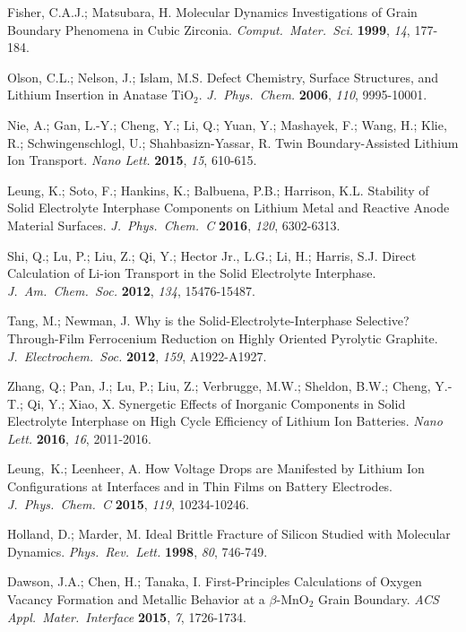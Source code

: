 \documentclass[prb,preprint,amsmath,amssymb]{revtex4}
\begin{document}
\begin{references}
Fisher, C.A.J.; Matsubara, H.  Molecular Dynamics Investigations of
Grain Boundary Phenomena in Cubic Zirconia.  {\it Comput.~Mater.~Sci.}
{\bf 1999}, {\it 14}, 177-184.

Olson, C.L.; Nelson, J.; Islam, M.S.  
Defect Chemistry, Surface Structures, and Lithium Insertion in Anatase TiO$_2$.
{\it J.~Phys.~Chem.} {\bf 2006}, {\it 110}, 9995-10001.

Nie, A.; Gan, L.-Y.; Cheng, Y.; Li, Q.; Yuan, Y.; Mashayek, F.; 
Wang, H.; Klie, R.; Schwingenschlogl, U.; Shahbasizn-Yassar, R.
Twin Boundary-Assisted Lithium Ion Transport.  {\it Nano Lett.}
{\bf 2015}, {\it 15}, 610-615.

Leung, K.; Soto, F.; Hankins, K.; Balbuena, P.B.; Harrison, K.L.
Stability of Solid Electrolyte Interphase Components on Lithium
Metal and Reactive Anode Material Surfaces.
{\it J.~Phys.~Chem.~C} {\bf 2016}, {\it 120}, 6302-6313.

Shi, Q.; Lu, P.; Liu, Z.; Qi, Y.; Hector Jr., L.G.; Li, H.; Harris, S.J.
Direct Calculation of Li-ion Transport in the Solid Electrolyte Interphase.
{\it J.~Am.~Chem.~Soc.} {\bf 2012}, {\it 134}, 15476-15487.

Tang, M.; Newman, J. 
Why is the Solid-Electrolyte-Interphase Selective?  Through-Film
Ferrocenium Reduction on Highly Oriented Pyrolytic Graphite.
{\it J.~Electrochem.~Soc.} {\bf 2012}, {\it 159}, A1922-A1927.

Zhang, Q.; Pan, J.; Lu, P.; Liu, Z.; Verbrugge, M.W.; Sheldon, B.W.;
Cheng, Y.-T.; Qi, Y.; Xiao, X.
Synergetic Effects of Inorganic Components in Solid Electrolyte Interphase
on High Cycle Efficiency of Lithium Ion Batteries.
{\it Nano Lett.} {\bf 2016}, {\it 16}, 2011-2016.

Leung,~K.; Leenheer, A.
How Voltage Drops are Manifested by Lithium Ion Configurations at Interfaces
and in Thin Films on Battery Electrodes.
{\it J.~Phys.~Chem.~C} {\bf 2015}, {\it 119}, 10234-10246.

Holland, D.; Marder, M.
Ideal Brittle Fracture of Silicon Studied with Molecular Dynamics.
{\it Phys.~Rev.~Lett.} {\bf 1998}, {\it 80}, 746-749.

Dawson, J.A.; Chen, H.; Tanaka, I.  First-Principles Calculations of
Oxygen Vacancy Formation and Metallic Behavior at a $\beta$-MnO$_2$
Grain Boundary. {\it ACS Appl.~Mater.~Interface} {\bf 2015}, {\it 7},
1726-1734.


\end{references}
\end{document}

